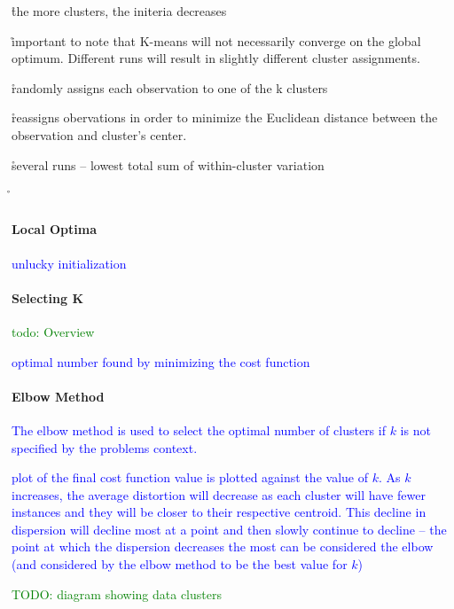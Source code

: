 \r{the more clusters, the initeria decreases}


\r{important to note that K-means will not necessarily converge on the global optimum. Different runs will result in slightly different cluster assignments.}

\r{randomly assigns each observation to one of the k clusters}

\r{reassigns obervations in order to minimize the Euclidean distance between the observation and cluster's center.}

\r{several runs -- lowest total sum of within-cluster variation}


\r{}

\paragraph{Local Optima}

\textcolor{blue}{unlucky initialization}

\paragraph{Selecting K}

\textcolor{green}{todo: Overview}

\textcolor{blue}{optimal number found by minimizing the cost function}

\paragraph{Elbow Method}

\textcolor{blue}{The elbow method is used to select the optimal number of clusters if $k$ is not specified by the problems context.}

\textcolor{blue}{plot of the final cost function value is plotted against the value of $k$. As $k$ increases, the average distortion will decrease as each cluster will have fewer instances and they will be closer to their respective centroid. This decline in dispersion will decline most at a point and then slowly continue to decline -- the point at which the dispersion decreases the most can be considered the elbow (and considered by the elbow method to be the best value for $k$)}

\textcolor{green}{TODO: diagram showing data clusters}

